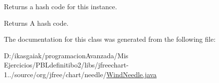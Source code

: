 Returns a hash code for this instance.

\begin{DoxyReturn}{Returns}
A hash code. 
\end{DoxyReturn}


The documentation for this class was generated from the following file\+:\begin{DoxyCompactItemize}
\item 
D\+:/ikasgaiak/programacion\+Avanzada/\+Mis Ejercicios/\+P\+B\+Ldefinitibo2/libs/jfreechart-\/1../source/org/jfree/chart/needle/\mbox{\hyperlink{_wind_needle_8java}{Wind\+Needle.\+java}}\end{DoxyCompactItemize}
